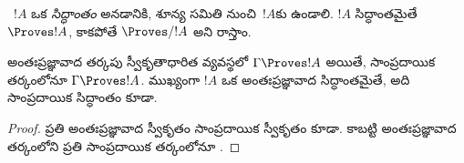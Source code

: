 \documentclass[../../../include/open-logic-section]{subfiles}
\begin{document}
\begin{defn}[సిద్ధాంతాలు]
~$!A$ ఒక
\emph{సిద్ధాంతం} అనడానికి, శూన్య సమితి నుంచి~$!A$కు
 ఉండాలి. $!A$ సిద్ధాంతమైతే
$\Proves !A$, కాకపోతే $\Proves/ !A$ అని రాస్తాం.
\end{defn}

\begin{prop}
  అంతఃప్రజ్ఞావాద తర్కపు స్వీకృతాధారిత
   వ్యవస్థలో
  $\Gamma \Proves !A$ అయితే, సాంప్రదాయిక తర్కంలోనూ
  $\Gamma \Proves !A$. ముఖ్యంగా $!A$ ఒక
  అంతఃప్రజ్ఞావాద సిద్ధాంతమైతే, అది సాంప్రదాయిక
  సిద్ధాంతం కూడా.
\end{prop}

\begin{proof}
  ప్రతి అంతఃప్రజ్ఞావాద స్వీకృతం సాంప్రదాయిక
  స్వీకృతం కూడా. కాబట్టి అంతఃప్రజ్ఞావాద
  తర్కంలోని ప్రతి 
  సాంప్రదాయిక తర్కంలోనూ
  .
\end{proof}
\end{document}
